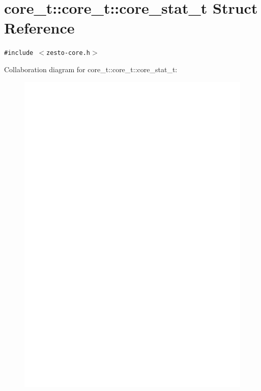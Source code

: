 \section{core\_\-t::core\_\-t::core\_\-stat\_\-t Struct Reference}
\label{structcore__t_1_1core__stat__t}
{\tt \#include $<$zesto-core.h$>$}

Collaboration diagram for core\_\-t::core\_\-t::core\_\-stat\_\-t:\nopagebreak
\begin{figure}[H]
\begin{center}
\leavevmode
\includegraphics[width=400pt]{structcore__t_1_1core__stat__t__coll__graph}
\end{center}
\end{figure}
